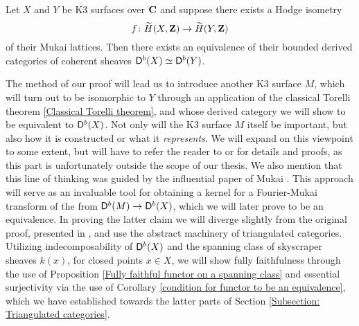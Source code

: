 \begin{proposition}
    \label{Hodge isometry implies D equivalence}
    Let $X$ and $Y$ be K3 surfaces over $\mathbf C$ and suppose there exists a Hodge isometry 
    \[
        f \colon \widetilde{H}(X, \mathbf Z) \to \widetilde{H}(Y, \mathbf Z)
    \]
    of their Mukai lattices. Then there exists an equivalence of their bounded derived categories of coherent sheaves $\mathsf{D}^b(X) \simeq \mathsf{D}^b(Y)$.
\end{proposition}
The method of our proof will lead us to introduce another K3 surface $M$, which will turn out to be isomorphic to $Y$ through an application of the classical Torelli theorem \ref{Classical Torelli theorem}, and whose derived category we will show to be equivalent to $\mathsf{D}^b(X)$. Not only will the K3 surface $M$ itself be important, but also how it is constructed or what it \emph{represents}. We will expand on this viewpoint to some extent, but will have to refer the reader to \cite{HuybrechtsLehn2010} or \cite{vanBree2020} for details and proofs, as this part is unfortunately outside the scope of our thesis. We also mention that this line of thinking was guided by the influential paper of Mukai \cite{Mukai1987}. This approach will serve as an invaluable tool for obtaining a kernel for a Fourier-Mukai transform of the from $\mathsf{D}^b(M) \to \mathsf{D}^b(X)$, which we will later prove to be an equivalence. 
In proving the latter claim we will diverge slightly from the original proof, presented in \cite{Orlov-K3}, and use the abstract machinery of triangulated categories. Utilizing indecomposability of $\mathsf{D}^b(X)$ and the spanning class of skyscraper sheaves $k(x)$, for closed points $x \in X$, we will show fully faithfulness through the use of Proposition \ref{Fully faithful functor on a spanning class} and essential surjectivity via the use of Corollary \ref{condition for functor to be an equivalence}, which we have established towards the latter parts of Section \ref{Subsection: Triangulated categories}.



